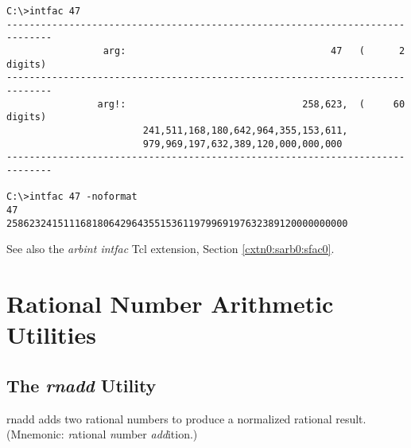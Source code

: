 \begin{dosutilcommandsampleinvocations}
\begin{scriptsize}
\begin{verbatim}
C:\>intfac 47
------------------------------------------------------------------------------
                 arg:                                    47   (      2 digits)
------------------------------------------------------------------------------
                arg!:                               258,623,  (     60 digits)
                        241,511,168,180,642,964,355,153,611,
                        979,969,197,632,389,120,000,000,000
------------------------------------------------------------------------------

C:\>intfac 47 -noformat
47
258623241511168180642964355153611979969197632389120000000000
\end{verbatim}
\end{scriptsize}
\end{dosutilcommandsampleinvocations}

\begin{dosutilcommandseealso}
See also the \emph{arbint intfac} Tcl extension, 
Section \cxtnzeroxrefhyphen{}\ref{cxtn0:sarb0:sfac0}.
\end{dosutilcommandseealso}


\section{Rational Number Arithmetic Utilities}
\label{cdcm0:srnu0}


\subsection{The \emph{rnadd} Utility}
\label{cdcm0:srnu0:srna0}

\begin{dosutilcommandname}{rnadd}%
adds two rational numbers to produce a normalized rational result.  
(Mnemonic:  \emph{r}ational \emph{n}umber
\emph{add}ition.)
\end{dosutilcommandname}

